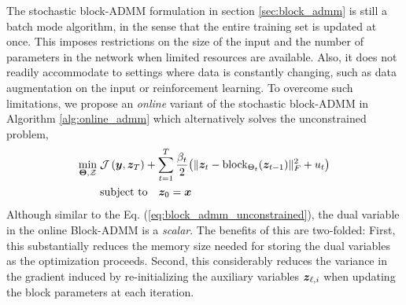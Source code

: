 The stochastic block-ADMM formulation in section \ref{sec:block_admm} is still a batch mode algorithm, in the sense that the entire training set is updated at once. This imposes restrictions on the size of the input and the number of parameters in the network when limited resources are available. %
Also, it does not readily accommodate to settings where data is constantly changing, such as data augmentation on the input or reinforcement learning. To overcome such limitations, we propose an \textit{online} variant of the stochastic block-ADMM in Algorithm \ref{alg:online_admm} which alternatively solves the unconstrained problem, 
\begin{align}\label{eq:scalar_dual}
	\min_{ {\bf \Theta}, \mathcal{Z}} \; &\mathcal{J}\left({\bm{y}}, {\bm{z}}_{T} \right) 
	+ \sum_{t=1}^{T} \frac{\beta_t}{2} \big( \|{\bm{z}}_t - \mathrm{block}_{\Theta_t}({\bm{z}}_{t-1}) \|_F^2 + u_t\big) \nonumber\\
	& {\rm subject~to} \quad {\bm{z}}_{0} = {\bm{x}} 
\end{align}
Although similar to the Eq. (\ref{eq:block_admm_unconstrained}), the dual variable in the online Block-ADMM is a \textit{scalar}. The benefits of this are two-folded: First, this substantially reduces the memory size needed for storing the dual variables as the optimization proceeds. Second, this considerably reduces the variance in the gradient induced by re-initializing the auxiliary variables ${\bm{z}}_{\ell,i}$ when updating the block parameters at each iteration. %


